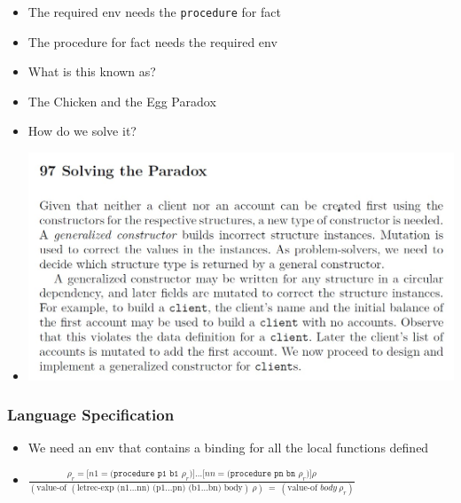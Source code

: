 \documentclass{beamer}
\begin{document}
\begin{frame}[fragile]
\begin{tiny}
\begin{itemize}
\item<4-> The required env needs the \texttt{procedure} for fact

\item<4-> The procedure for fact needs the required env

\item<4-> What is this known as?

\item<5-> The Chicken and the Egg Paradox

\item<5-> How do we solve it?

\item<6->
\begin{center}
\includegraphics[scale=0.4]{generalized-constructor-APD.jpg}
\end{center}

\end{itemize}
\end{tiny}
\end{frame}

\begin{frame}[fragile]
\frametitle{Language Specification}
\begin{scriptsize}
\begin{itemize}
\item<1-> We need an env that contains a binding for all the local functions defined

\item<1->
$\frac{\rho_r = \texttt{[}n1=\texttt{(procedure p1 b1 }\rho_r)\texttt{]}\ldots \texttt{[}nn=\texttt{(procedure pn bn }\rho_r)\texttt{]}\rho}
      {(\text{value-of } (\text{letrec-exp (n1\ldots nn) (p1\ldots pn) (b1\ldots bn) body}) \ \rho) \ = \ (\text{value-of } body \ \rho_r)}$

\end{itemize}
\end{scriptsize}
\end{frame}
\end{document}
